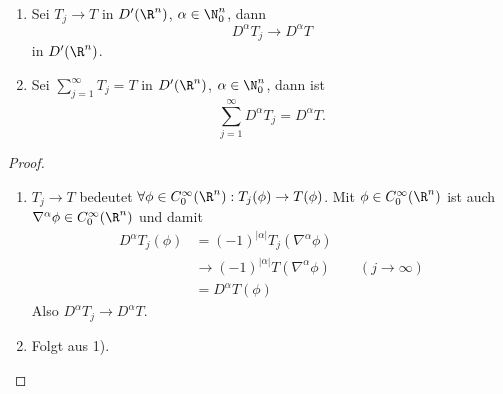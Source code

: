 \begin{st} \label{5.16}
	\begin{enumerate}[1)]
		\item
			Sei $T_j \to T$ in $D'(\R^n)$, $\alpha \in \N_0^n$, dann
			\[
				D^\alpha T_j \to D^\alpha T
			\]
			in $D'(\R^n)$.
		\item
			Sei $\sum_{j=1}^\infty T_j = T$ in $D'(\R^n)$, $\alpha \in \N_0^n$, dann ist
			\[
				\sum_{j=1}^\infty D^\alpha T_j = D^\alpha T.
			\]
	\end{enumerate}
	\begin{proof}
		\begin{enumerate}[1)]
			\item
				$T_j \to T$ bedeutet $\forall \phi \in C_0^\infty(\R^n) : T_j(\phi) \to T(\phi)$.
				Mit $\phi \in C_0^\infty(\R^n)$ ist auch $\nabla^\alpha \phi \in C_0^\infty (\R^n)$ und damit
				\begin{align*}
					D^\alpha T_j(\phi)
					&= (-1)^{|\alpha|} T_j(\nabla^\alpha \phi) \\
					&\to (-1)^{|\alpha|} T(\nabla^\alpha \phi) \qquad (j\to \infty) \\
					&= D^\alpha T(\phi)
				\end{align*}
				Also $D^\alpha T_j \to D^\alpha T$.
			\item
				Folgt aus 1).
		\end{enumerate}
	\end{proof}
\end{st}

